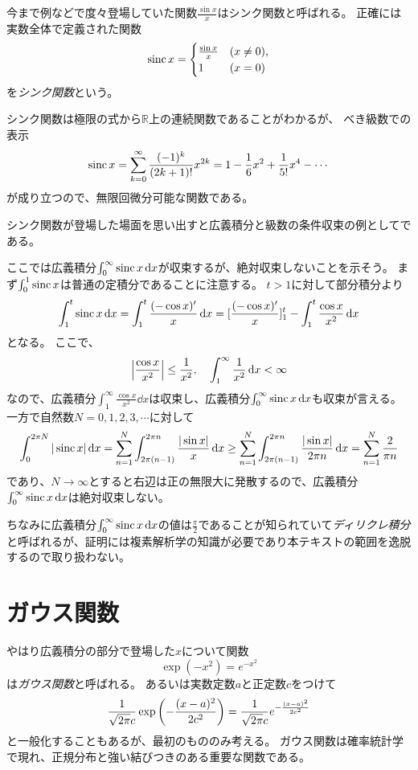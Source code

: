 今まで例などで度々登場していた関数$\frac{\sin x}{x}$はシンク関数と呼ばれる。
正確には実数全体で定義された関数
$$
\operatorname{sinc} x =
\begin{cases}
\frac{\sin x}{x} & (x \ne 0), \\
1 & (x = 0) \\
\end{cases}
$$
を\emph{シンク関数}という。

シンク関数は極限の式から$\mathbb{R}$上の連続関数であることがわかるが、
べき級数での表示
$$
\operatorname{sinc} x = \sum_{k = 0}^\infty \frac{(-1)^k}{(2 k+1)!}x^{2 k} = 1-\frac{1}{6}x^2+\frac{1}{5!}x^4-\cdots
$$
が成り立つので、無限回微分可能な関数である。

シンク関数が登場した場面を思い出すと広義積分と級数の条件収束の例としてである。

ここでは広義積分$\int_0^\infty \operatorname{sinc} x\dd{x}$が収束するが、絶対収束しないことを示そう。
まず$\int_0^1 \operatorname{sinc} x$は普通の定積分であることに注意する。
$t > 1$に対して部分積分より
$$
\int_1^t \operatorname{sinc} x\dd{x} = \int_1^t \frac{(-\cos x)'}{x}\dd{x} = [\frac{(-\cos x)'}{x}]_1^t-\int_1^t \frac{\cos x}{x^2}\dd{x}
$$
となる。
ここで、
$$
\abs{\frac{\cos x}{x^2}} \le \frac{1}{x^2},
\quad \int_1^\infty \frac{1}{x^2}\dd{x} < \infty
$$
なので、広義積分$\int_1^\infty \frac{\cos x}{x^2}\dd{x}$は収束し、広義積分$\int_0^\infty \operatorname{sinc} x\dd{x}$も収束が言える。
一方で自然数$N = 0, 1, 2, 3, \cdots$に対して
$$
\int_0^{2\pi N} |\operatorname{sinc} x|\dd{x} = \sum_{n = 1}^N \int_{2\pi(n-1)}^{2\pi n} \frac{|\sin x|}{x}\dd{x} \ge \sum_{n = 1}^N \int_{2\pi(n-1)}^{2\pi n} \frac{|\sin x|}{2\pi n}\dd{x} = \sum_{n = 1}^N \frac{2}{\pi n}
$$
であり、$N \to \infty$とすると右辺は正の無限大に発散するので、広義積分$\int_0^\infty \operatorname{sinc} x\dd{x}$は絶対収束しない。

ちなみに広義積分$\int_0^\infty \operatorname{sinc} x\dd{x}$の値は$\frac{\pi}{2}$であることが知られていて\emph{ディリクレ積分}と呼ばれるが、証明には複素解析学の知識が必要であり本テキストの範囲を逸脱するので取り扱わない。

\section{ガウス関数}

やはり広義積分の部分で登場した$x$について関数
$$
\exp(-x^2) = e^{-x^2}
$$
は\emph{ガウス関数}と呼ばれる。
あるいは実数定数$a$と正定数$c$をつけて
$$
\frac{1}{\sqrt{2\pi}c}\exp\qty(-\frac{(x-a)^2}{2 c^2}) = \frac{1}{\sqrt{2\pi}c}e^{-\frac{(x-a)^2}{2 c^2}}
$$
と一般化することもあるが、最初のもののみ考える。
ガウス関数は確率統計学で現れ、正規分布と強い結びつきのある重要な関数である。

